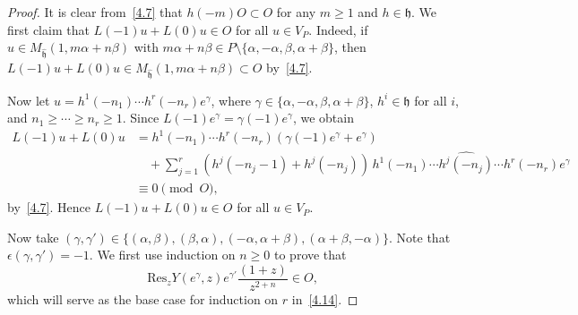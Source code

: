 \documentclass[12pt,a4paper,reqno]{amsart}
\numberwithin{equation}{section}
\numberwithin{equation}{section}
\theoremstyle{definition}
\def \al{\alpha}
\def \ga {\gamma}
\def \b {\beta}
\def \h {\mathfrak{h}}
\def\Res{\mathrm{Res}}
\begin{document}
	\begin{proof}
		It is clear from~\eqref{4.7} that $h(-m)O\subset O$ for any $m\geq 1$ and $h\in\h$.  
		We first claim that $L(-1)u+L(0)u\in O$ for all $u\in V_P$.  
		Indeed, if $u\in M_{\hat{\h}}(1,m\al+n\b)$ with $m\al+n\b\in P\setminus\{\al,-\al,\b,\al+\b\}$,  
		then $L(-1)u+L(0)u\in M_{\hat{\h}}(1,m\al+n\b)\subset O$ by~\eqref{4.7}.  
		
		Now let $u=h^1(-n_1)\cdots h^r(-n_r)e^\ga$, where $\ga\in\{\al,-\al,\b,\al+\b\}$,  
		$h^i\in\h$ for all $i$, and $n_1\geq\cdots\geq n_r\geq 1$.  
		Since $L(-1)e^\ga=\ga(-1)e^\ga$, we obtain
		\begin{align*}
			L(-1)u+L(0)u
			&=h^1(-n_1)\cdots h^r(-n_r)(\ga(-1)e^\ga+e^\ga)\\
			&\quad+\sum_{j=1}^r (h^j(-n_j-1)+h^j(-n_j))\,h^1(-n_1)\cdots \widehat{h^j(-n_j)}\cdots h^r(-n_r)e^\ga\\
			&\equiv 0\pmod{O},
		\end{align*}
		by~\eqref{4.7}. Hence $L(-1)u+L(0)u\in O$ for all $u\in V_P$.
		
		Now take $(\ga,\ga')\in\{(\al,\b),(\b,\al),(-\al,\al+\b),(\al+\b,-\al)\}$.  
		Note that $\epsilon(\ga,\ga')=-1$.
		We first use induction on $n\geq 0$ to prove that
		\begin{equation}\label{4.15}
			\Res_z Y(e^{\ga},z)e^{\ga'}\frac{(1+z)}{z^{2+n}}\in O,
		\end{equation}
		which will serve as the base case for induction on $r$ in~\eqref{4.14}.
		

\end{proof}
\end{document}
